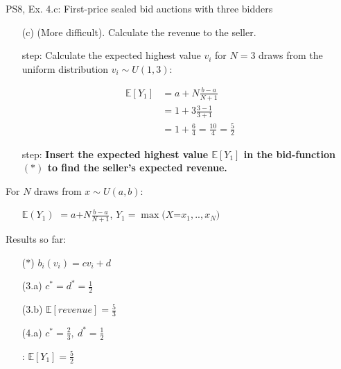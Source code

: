 \begin{frame}{PS8, Ex. 4.c: First-price sealed bid auctions with three bidders}
    \begin{itemize}
      \item[(c)] (More difficult). Calculate the revenue to the seller.
    \end{itemize}
    \vspace{-8pt}
    \begin{multicols}{2}
      \begin{itemize}
        \item[\nth{1} step:] Calculate the expected highest value $v_i$ for $N=3$ draws from the uniform distribution $v_i\sim U(1,3)$:
      \end{itemize}
      \vspace{-8pt}
      \begin{align*}
        \mathbb{E}[Y_1]&=a+N\frac{b-a}{N+1}\\
                       &=1+3\frac{3-1}{3+1}\\
                       &=1+\frac{6}{4}=\frac{10}{4}=\frac{5}{2}
      \end{align*}
      \vspace{-12pt}
      \begin{itemize}
        \item[\nth{2} step:] \textbf{Insert the expected highest value $\mathbb{E}[Y_1]$ in the bid-function $(*)$  to find the seller's expected revenue.}
      \end{itemize}
      \vfill\null\columnbreak
      For $N$ draws from $x\sim U(a, b):$
      \vspace{-6pt}
      \begin{enumerate}
        \item[$\mathbb{E}(Y_1)$] $=a$+$N\frac{b-a}{N+1}$, $Y_1=\max(X$=$x_1,..,x_N)$
      \end{enumerate}
      \vspace{-6pt}
      Results so far:
      \vspace{-6pt}
      \begin{itemize}
        \item[($*$)] $b_i(v_i) = cv_i+d$
        \item[(3.a)] $c^*=d^*=\frac{1}{2}$
        \item[(3.b)] $\mathbb{E}[revenue]=\frac{5}{3}$
        \item[(4.a)] $c^*=\frac{2}{3},\ d^*=\frac{1}{2}$
        \item[\nth{1}:] $\mathbb{E}[Y_1]=\frac{5}{2}$
      \end{itemize}
      \vfill\null
    \end{multicols}
    \vfill\null
\end{frame}
